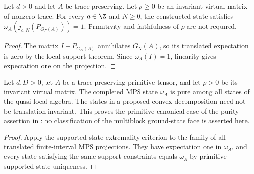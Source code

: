 \begin{lemma}
    \label{thm:mps_support_projection_expectation_one}
    \leanok
    Let $d>0$ and let $A$ be trace preserving. Let $\rho\ge0$ be an invariant
    virtual matrix of nonzero trace. For every $a\in\Z$ and $N\ge0$, the
    constructed state satisfies
    $\omega_A(j_{a,N}(P_{G_N(A)}))=1$.
    Primitivity and faithfulness of $\rho$ are not required.
\end{lemma}
\begin{proof}
    \leanok
    The matrix $I-P_{G_N(A)}$ annihilates $G_N(A)$, so its translated
    expectation is zero by the local support theorem. Since $\omega_A(I)=1$,
    linearity gives expectation one on the projection.
\end{proof}

\begin{lemma}
    \label{thm:primitive_quasi_local_purity}
    \leanok
    Let $d,D>0$, let $A$ be a trace-preserving primitive tensor, and let
    $\rho>0$ be its invariant virtual matrix. The completed MPS state
    $\omega_A$ is pure among all states of the quasi-local algebra.
    The states in a proposed convex decomposition need not be translation
    invariant. This proves the primitive canonical case of the purity
    assertion in \cite[Section~3]{Nachtergaele1996Spectral}; no classification
    of the multiblock ground-state face is asserted here.
\end{lemma}
\begin{proof}
    \leanok
    Apply the supported-state extremality criterion to the family of
    all translated finite-interval MPS projections. They have expectation
    one in $\omega_A$, and every state satisfying the same support constraints
    equals $\omega_A$ by primitive supported-state uniqueness.
\end{proof}

